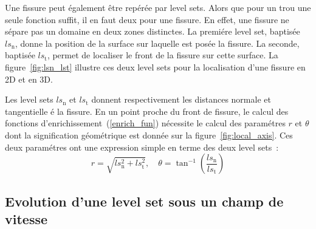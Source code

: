 Une fissure peut \'egalement \^etre rep\'er\'ee par level sets.
Alors que pour un trou une seule fonction suffit, il en faut deux
pour une fissure. En effet, une fissure ne s\'epare pas un domaine
en deux zones distinctes.
La premi\'ere level set, baptis\'ee $ls_\mathrm{n}$,
donne la position de la surface sur laquelle est pos\'ee la fissure.
La seconde, baptis\'ee $ls_\mathrm{t}$, permet de localiser le front
de la fissure sur cette surface. La figure~\ref{fig:lsn_lst}
illustre ces deux level sets pour la
localisation d'une fissure en
2D et  en 3D.




Les level sets $ls_\mathrm{n}$ et $ls_\mathrm{t}$ donnent respectivement les distances normale et
tangentielle \'e la fissure.
En un point proche du front de fissure, le calcul des fonctions
d'enrichissement~(\ref{enrich_fun}) n\'ecessite le calcul des param\'etres
$r$ et $\theta$ dont la signification g\'eom\'etrique est donn\'ee sur la
figure~\ref{fig:local_axis}.
Ces deux param\'etres ont une expression simple en terme des deux
level sets~:
\begin{equation}
  \label{eq:rtheta}
  r = \sqrt{ls_\mathrm{n}^2 + ls_\mathrm{t}^2}, \quad \theta = \tan^{-1}(\frac{ls_\mathrm{n}}{ls_\mathrm{t}})
\end{equation}




\subsection{Evolution d'une level set sous un champ de vitesse }

